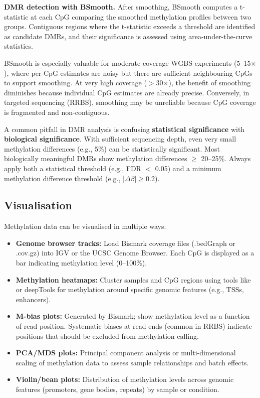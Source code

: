 \textbf{DMR detection with BSmooth.} After smoothing, BSmooth computes a t-statistic at each CpG comparing the smoothed methylation profiles between two groups. Contiguous regions where the t-statistic exceeds a threshold are identified as candidate DMRs, and their significance is assessed using area-under-the-curve statistics.

\begin{tipbox}
BSmooth is especially valuable for moderate-coverage WGBS experiments (5--15$\times$), where per-CpG estimates are noisy but there are sufficient neighbouring CpGs to support smoothing. At very high coverage ($>$30$\times$), the benefit of smoothing diminishes because individual CpG estimates are already precise. Conversely, in targeted sequencing (RRBS), smoothing may be unreliable because CpG coverage is fragmented and non-contiguous.
\end{tipbox}

\begin{warningbox}
A common pitfall in DMR analysis is confusing \textbf{statistical significance} with \textbf{biological significance}. With sufficient sequencing depth, even very small methylation differences (e.g., 5\%) can be statistically significant. Most biologically meaningful DMRs show methylation differences $\geq$ 20--25\%. Always apply both a statistical threshold (e.g., FDR $<$ 0.05) and a minimum methylation difference threshold (e.g., $|\Delta\beta| \geq 0.2$).
\end{warningbox}

\subsection{Visualisation}
\label{subsec:methylation:visualisation}

Methylation data can be visualised in multiple ways:

\begin{itemize}[itemsep=2pt]
  \item \textbf{Genome browser tracks:} Load Bismark coverage files (.bedGraph or .cov.gz) into IGV or the UCSC Genome Browser. Each CpG is displayed as a bar indicating methylation level (0--100\%).
  \item \textbf{Methylation heatmaps:} Cluster samples and CpG regions using tools like  or deepTools  for methylation around specific genomic features (e.g., TSSs, enhancers).
  \item \textbf{M-bias plots:} Generated by Bismark; show methylation level as a function of read position. Systematic biases at read ends (common in RRBS) indicate positions that should be excluded from methylation calling.
  \item \textbf{PCA/MDS plots:} Principal component analysis or multi-dimensional scaling of methylation data to assess sample relationships and batch effects.
  \item \textbf{Violin/bean plots:} Distribution of methylation levels across genomic features (promoters, gene bodies, repeats) by sample or condition.
\end{itemize}

